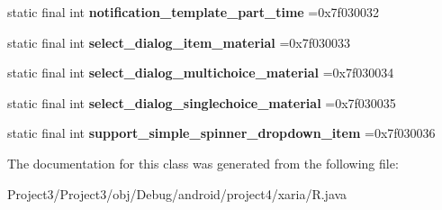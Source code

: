 \begin{DoxyCompactItemize}
static final int {\bfseries notification\+\_\+template\+\_\+part\+\_\+time} =0x7f030032
\item 
\mbox{\label{classproject4_1_1xaria_1_1R_1_1layout_a9cd1620550afea6b31c6163e80a8f02d}} 
static final int {\bfseries select\+\_\+dialog\+\_\+item\+\_\+material} =0x7f030033
\item 
\mbox{\label{classproject4_1_1xaria_1_1R_1_1layout_a431549f4dc0fee4f3bfa285556c47673}} 
static final int {\bfseries select\+\_\+dialog\+\_\+multichoice\+\_\+material} =0x7f030034
\item 
\mbox{\label{classproject4_1_1xaria_1_1R_1_1layout_a523bdffc6efe9d25511793f417bf6080}} 
static final int {\bfseries select\+\_\+dialog\+\_\+singlechoice\+\_\+material} =0x7f030035
\item 
\mbox{\label{classproject4_1_1xaria_1_1R_1_1layout_a1fe65f4064d16d70644519cacdf47fd4}} 
static final int {\bfseries support\+\_\+simple\+\_\+spinner\+\_\+dropdown\+\_\+item} =0x7f030036
\end{DoxyCompactItemize}


The documentation for this class was generated from the following file\+:\begin{DoxyCompactItemize}
\item 
Project3/\+Project3/obj/\+Debug/android/project4/xaria/R.\+java\end{DoxyCompactItemize}
